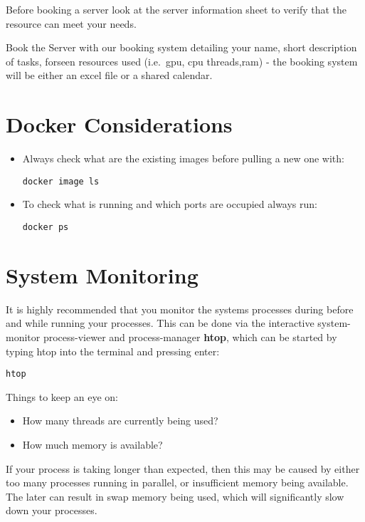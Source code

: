 \documentclass[
]{book}
\providecommand{\tightlist}{%
  \setlength{\itemsep}{0pt}\setlength{\parskip}{0pt}}
\begin{document}
Before booking a server look at the server information sheet to verify that the resource can meet your needs.

Book the Server with our booking system detailing your name, short description of tasks, forseen resources used (i.e.~gpu, cpu threads,ram) - the booking system will be either an excel file or a shared calendar.

\hypertarget{docker-considerations}{%
\section{Docker Considerations}\label{docker-considerations}}

\begin{itemize}
\item
  Always check what are the existing images before pulling a new one with:

\begin{verbatim}
docker image ls
\end{verbatim}
\item
  To check what is running and which ports are occupied always run:

\begin{verbatim}
docker ps 
\end{verbatim}
\end{itemize}

\hypertarget{system-monitoring}{%
\section{System Monitoring}\label{system-monitoring}}

It is highly recommended that you monitor the systems processes during before and while running your processes. This can be done via the interactive system-monitor process-viewer and process-manager \textbf{htop}, which can be started by typing htop into the terminal and pressing enter:

\begin{verbatim}
htop
\end{verbatim}

Things to keep an eye on:

\begin{itemize}
\tightlist
\item
  How many threads are currently being used?
\item
  How much memory is available?
\end{itemize}

If your process is taking longer than expected, then this may be caused by either too many processes running in parallel, or insufficient memory being available. The later can result in swap memory being used, which will significantly slow down your processes.
\end{document}
